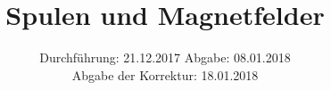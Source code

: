 

\subject{Versuch 308}
\title{Spulen und Magnetfelder}
\date{
  Durchführung: 21.12.2017
  \hspace{3em}
  Abgabe: 08.01.2018 \\
  Abgabe der Korrektur: 18.01.2018
}




\maketitle
\thispagestyle{empty}
\tableofcontents
\newpage



\newpage

\newpage



\printbibliography{}


